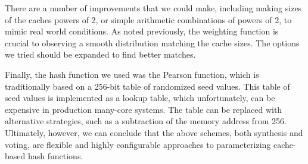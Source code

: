 There are a number of improvements that we could make, including making sizes of
the caches powers of 2, or simple arithmetic combinations of powers of 2, to
mimic real world conditions. As noted previously, the weighting function is
crucial to observing a smooth distribution matching the cache sizes.  The
options we tried should be expanded to find better matches.

Finally, the hash function we used was the Pearson function, which is
traditionally based on a 256-bit table of randomized seed values.  This table of
seed values is implemented as a lookup table, which unfortunately, can be
expensive in production many-core systems.  The table can be replaced with
alternative strategies, such as a subtraction of the memory address from
256. Ultimately, however, we can conclude that the above schemes, both synthesis
and voting, are flexible and highly configurable approaches to parameterizing
cache-based hash functions.
